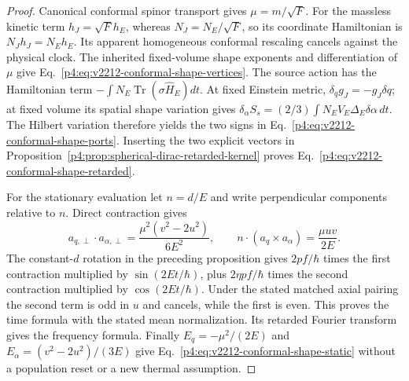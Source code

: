 \documentclass[12pt,a4paper]{article}
\begin{document}
\begin{proof}
Canonical conformal spinor transport gives $\mu=m/\sqrt F$.
For the massless kinetic term $h_J=\sqrt Fh_E$, whereas
$N_J=N_E/\sqrt F$, so its coordinate Hamiltonian is
$N_Jh_J=N_Eh_E$. Its apparent homogeneous conformal rescaling cancels
against the physical clock. The inherited fixed-volume shape exponents
and differentiation of $\mu$ give
Eq.~\eqref{p4:eq:v2212-conformal-shape-vertices}.
The source action has the Hamiltonian term
$-\int N_E\operatorname{Tr}(\sigma\widehat H_E)dt$.
At fixed Einstein metric, $\delta_qg_J=-g_J\delta q$;
at fixed volume its spatial shape variation gives
$\delta_\alpha S_s=(2/3)\int N_EV_E\Delta_E\delta\alpha\,dt$.
The Hilbert variation therefore yields the two signs in
Eq.~\eqref{p4:eq:v2212-conformal-shape-ports}.
Inserting the two explicit vectors in
Proposition~\ref{p4:prop:spherical-dirac-retarded-kernel} proves
Eq.~\eqref{p4:eq:v2212-conformal-shape-retarded}.

For the stationary evaluation let $n=d/E$ and write perpendicular
components relative to $n$. Direct contraction gives
\[
 a_{q,\perp}\cdot a_{\alpha,\perp}
 =\frac{\mu^2(v^2-2u^2)}{6E^2},\qquad
 n\cdot(a_q\times a_\alpha)=\frac{\mu uv}{2E}.
\]
The constant-$d$ rotation in the preceding proposition gives
$2pf/\hbar$ times the first contraction multiplied by
$\sin(2Et/\hbar)$, plus
$2\eta pf/\hbar$ times the second contraction multiplied by
$\cos(2Et/\hbar)$.
Under the stated matched axial pairing the second term is odd in $u$
and cancels, while the first is even. This proves the time formula with
the stated mean normalization. Its retarded Fourier transform gives
the frequency formula. Finally
$E_q=-\mu^2/(2E)$ and
$E_\alpha=(v^2-2u^2)/(3E)$ give
Eq.~\eqref{p4:eq:v2212-conformal-shape-static} without a population
reset or a new thermal assumption.
\end{proof}
\end{document}
